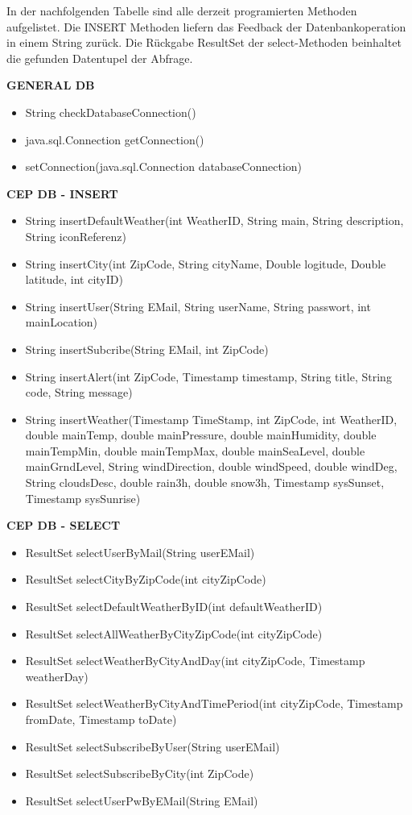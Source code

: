 In der nachfolgenden Tabelle sind alle derzeit programierten Methoden aufgelistet.
Die INSERT  Methoden liefern das Feedback der Datenbankoperation in einem String zurück. Die Rückgabe ResultSet der select-Methoden beinhaltet die gefunden Datentupel der Abfrage.

{\bf GENERAL DB}
\begin{itemize}
\item String  checkDatabaseConnection()
\item java.sql.Connection getConnection()
\item setConnection(java.sql.Connection  databaseConnection)
\end{itemize}

{\bf CEP DB - INSERT}
\begin{itemize}
\item String insertDefaultWeather(int WeatherID, String main, String description, String iconReferenz)
\item String insertCity(int ZipCode, String cityName, Double logitude, Double latitude, int cityID)
\item String insertUser(String EMail, String userName, String passwort, int mainLocation)
\item String insertSubcribe(String EMail, int ZipCode)
\item String insertAlert(int ZipCode, Timestamp timestamp, String title, String code, String message)
\item String insertWeather(Timestamp TimeStamp, int ZipCode, int WeatherID, 
				double mainTemp, double mainPressure, double mainHumidity, double mainTempMin,
				double mainTempMax, double mainSeaLevel, double mainGrndLevel,
				String windDirection, double windSpeed, double windDeg, String cloudsDesc, double rain3h, 
				double snow3h, 
				Timestamp sysSunset, Timestamp sysSunrise)
\end{itemize}

{\bf CEP DB - SELECT }
\begin{itemize}
\item ResultSet selectUserByMail(String userEMail)
\item ResultSet selectCityByZipCode(int cityZipCode)
\item ResultSet selectDefaultWeatherByID(int defaultWeatherID)
\item ResultSet selectAllWeatherByCityZipCode(int cityZipCode)
\item ResultSet selectWeatherByCityAndDay(int cityZipCode, Timestamp weatherDay)
\item ResultSet selectWeatherByCityAndTimePeriod(int cityZipCode, Timestamp fromDate, Timestamp toDate) 
\item ResultSet selectSubscribeByUser(String userEMail)
\item ResultSet selectSubscribeByCity(int ZipCode)
\item ResultSet selectUserPwByEMail(String EMail)
\end{itemize}

